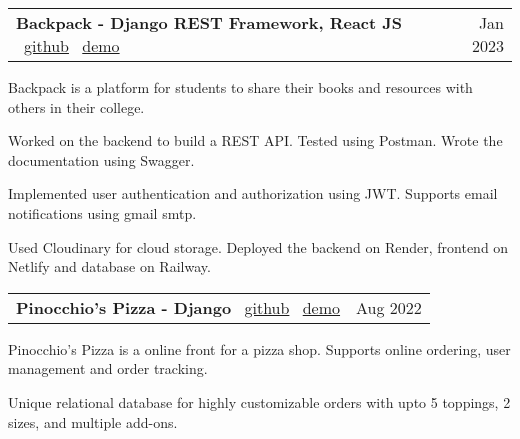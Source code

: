 \documentclass[a4paper,20pt]{article}
\makeatletter
\newcommand{\resumeSmallSubheading}[2]{
  \vspace{-1pt}\item
    \begin{tabular*}{0.97\textwidth}{l@{\extracolsep{\fill}}r}
      #1 & #2 \\
    \end{tabular*}\vspace{-8pt}
}
\makeatother
\begin{document}
    \resumeSmallSubheading{\textbf{Backpack - Django REST Framework, React JS \textbar} ~\href{https://github.com/satyamrs00/backpack/}{github} \textbar ~\href{https://main--back-backpack.netlify.app/}{demo}}{Jan 2023}
        
    \begin{description}[font=$\bullet$]
        \item {Backpack is a platform for students to share their books and resources with others in their college.}
    \vspace{-5pt}
        \item {Worked on the backend to build a REST API. Tested using Postman. Wrote the documentation using Swagger.}
    \vspace{-5pt}
        \item {Implemented user authentication and authorization using JWT. Supports email notifications using gmail smtp.}
    \vspace{-5pt}
        \item {Used Cloudinary for cloud storage. Deployed the backend on Render, frontend on Netlify and database on Railway.}
    \end{description}

    \vspace{-5pt}

    \resumeSmallSubheading{\textbf{Pinocchio's Pizza - Django \textbar} ~\href{https://github.com/satyamrs00/pizza/}{github} \textbar ~\href{https://pizza-uyud.onrender.com/}{demo}}{Aug 2022}
    
    \begin{description}[font=$\bullet$]
        \item {Pinocchio's Pizza is a online front for a pizza shop. Supports online ordering, user management and order tracking.}
    \vspace{-5pt}
        \item {Unique relational database for highly customizable orders with upto 5 toppings, 2 sizes, and multiple add-ons.}
    \end{description}
\end{document}
